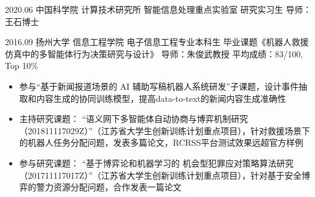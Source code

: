 \documentclass[zh]{resume}
\begin{document}
\makeheader

\par  %


\begin{educations}
\expedu
{2020.06}%
    {中国科学院}%
    {计算技术研究所}%
    {智能信息处理重点实验室}%
    {研究实习生}%
    {导师：王石博士}%
    { }

    
  \education%
    {2016.09}%
    {扬州大学}%
    {信息工程学院}%
    {电子信息工程专业本科生}%
    {毕业课题《机器人救援仿真中的多智能体行为决策研究与设计》}%
    {导师：朱俊武教授}%
    {平均成绩：83/100, Top 10\%}
\end{educations}

\begin{itemize}
\item 参与\enquote{基于新闻报道场景的 AI 辅助写稿机器人系统研发}子课题，设计事件抽取和内容生成的协同训练模型，提高data-to-text的新闻内容生成准确性
  \item 主持研究课题：
    \enquote{语义网下多智能体自动协商与博弈机制研究（201811117029Z）}（江苏省大学生创新训练计划重点项目），针对救援场景下的机器人任务分配问题，发表多篇论文，RCRSS平台测试效果远超官方样例
  \item 参与研究课题：
    \enquote{基于博弈论和机器学习的 机会型犯罪应对策略算法研究（201711117017Z）}（江苏省大学生创新训练计划重点项目），针对基于安全博弈的警力资源分配问题，合作发表一篇论文
\end{itemize}
\end{document}

